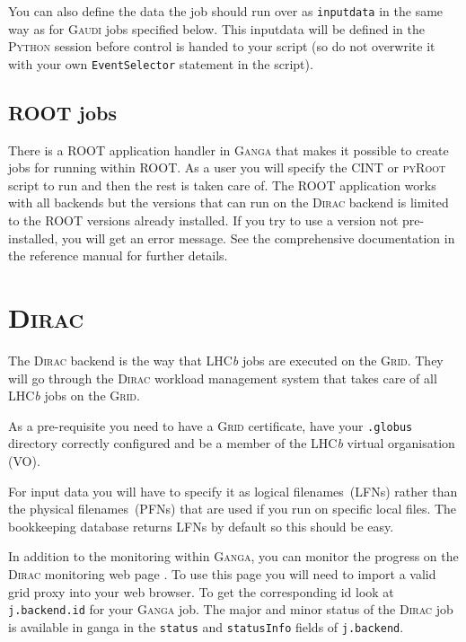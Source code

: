 \documentclass{howto}
\def\ganga {\textsc{Ganga}\xspace}
\def\python {\textsc{Python}\xspace}
\def\root {\textsc{ROOT}\xspace}
\def\lhcb {LHC{\em b\/}\xspace}
\def\gaudi {\textsc{Gaudi}\xspace}
\def\dirac {\textsc{Dirac}\xspace}
\def\grid {\textsc{Grid}\xspace}
\begin{document}
You can also define the data the job should run over as \texttt{inputdata} in
the same way as for \gaudi jobs specified below. This inputdata will be
defined in the \python session before control is handed to your script (so do
not overwrite it with your own \texttt{EventSelector} statement in the
script).


\subsection{\root jobs}
\label{sec:ROOT}
There is a \root application handler in \ganga that makes it possible to
create jobs for running within \root. As a user you will specify the
\textsc{CINT} or \textsc{pyRoot} script to run and then the rest is taken care
of. The \root application works with all backends but the versions that can
run on the \dirac backend is limited to the \root versions already
installed. If you try to use a version not pre-installed, you will get an
error message. See the comprehensive documentation in the reference manual for
further details.

\section{\dirac}
\label{sec:dirac}
The \dirac backend is the way that \lhcb jobs are executed on the \grid. They
will go through the \dirac workload management system that takes care of all
\lhcb jobs on the \grid.
\begin{notice}
  As a pre-requisite you need to have a \grid certificate, have your
  \texttt{.globus} directory correctly configured and be a member of the \lhcb
  virtual organisation (VO).
\end{notice}
For input data you will have to specify it as logical filenames~(LFNs) rather
than the physical filenames~(PFNs) that are used if you run on specific local
files. The bookkeeping database returns LFNs by default so this should be
easy.
\begin{seealso}
  In addition to the monitoring within \ganga, you can monitor the progress on
  the \dirac monitoring web page
  . To use
  this page you will need to import a valid grid proxy into your web browser. To
  get the corresponding id look at \texttt{j.backend.id} for your \ganga job.
  The major and minor status of the \dirac job is available in ganga in the
  \texttt{status} and \texttt{statusInfo} fields of \texttt{j.backend}.
\end{seealso}
\end{document}

